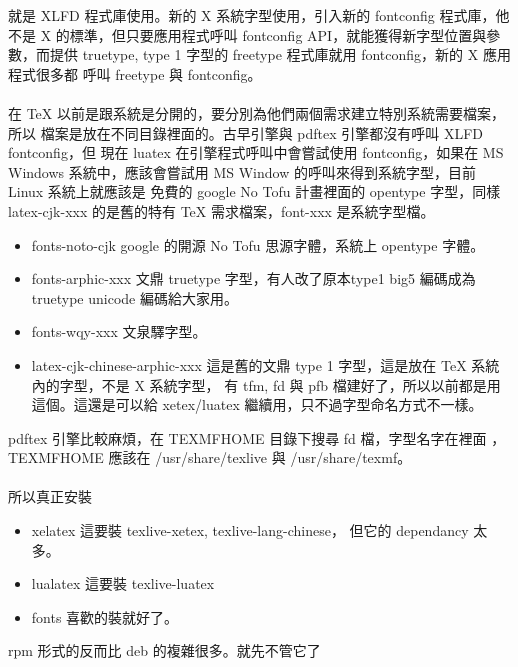 就是 XLFD 程式庫使用。新的 X 系統字型使用，引入新的 fontconfig 程式庫，他不是
X 的標準，但只要應用程式呼叫 fontconfig API，就能獲得新字型位置與參數，而提供
truetype, type 1 字型的 freetype 程式庫就用 fontconfig，新的 X 應用程式很多都
呼叫 freetype 與 fontconfig。
\\\\
在 \TeX{} 以前是跟系統是分開的，要分別為他們兩個需求建立特別系統需要檔案，所以
檔案是放在不同目錄裡面的。古早引擎與 pdftex 引擎都沒有呼叫 XLFD fontconfig，但
現在 {\XeTeX} luatex 在引擎程式呼叫中會嘗試使用 fontconfig，如果在 MS Windows
系統中，應該會嘗試用 MS Window 的呼叫來得到系統字型，目前 Linux 系統上就應該是
免費的 google No Tofu 計畫裡面的 opentype 字型，同樣 latex-cjk-xxx 的是舊的特有
\TeX{} 需求檔案，font-xxx 是系統字型檔。
\begin{itemize}
  \item fonts-noto-cjk google 的開源 No Tofu 思源字體，系統上 opentype 字體。
  \item fonts-arphic-xxx 文鼎 truetype 字型，有人改了原本type1 big5 編碼成為 
    truetype unicode 編碼給大家用。
  \item fonts-wqy-xxx 文泉驛字型。
  \item latex-cjk-chinese-arphic-xxx 這是舊的文鼎 type 1 字型，這是放在 \TeX{}
    系統內的字型，不是 X 系統字型， 有 tfm, fd 與 pfb 檔建好了，所以以前都是用
    這個。這還是可以給 xetex/luatex 繼續用，只不過字型命名方式不一樣。
\end{itemize}
pdftex 引擎比較麻煩，在 TEXMFHOME 目錄下搜尋 fd 檔，字型名字在裡面
，TEXMFHOME 應該在 /usr/share/texlive 與 /usr/share/texmf。
\\\\
所以真正安裝
\begin{itemize}
\item xelatex 這要裝 texlive-xetex, texlive-lang-chinese，
但它的 dependancy 太多。
\item lualatex 這要裝 texlive-luatex
\item fonts 喜歡的裝就好了。
\end{itemize}
rpm 形式的反而比 deb 的複雜很多。就先不管它了

